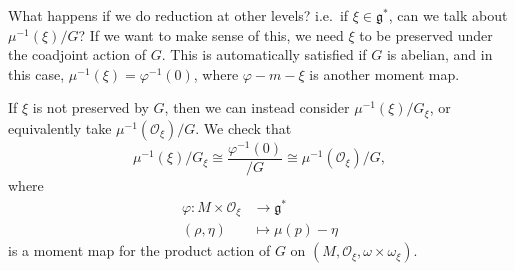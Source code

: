 \documentclass[a4paper]{article}
\begin{document}
What happens if we do reduction at other levels? i.e.\ if $\xi \in \mathfrak{g}^*$, can we talk about $\mu^{-1}(\xi)/G$? If we want to make sense of this, we need $\xi$ to be preserved under the coadjoint action of $G$. This is automatically satisfied if $G$ is abelian, and in this case, $\mu^{-1}(\xi) = \varphi^{-1}(0)$, where $\varphi -m - \xi$ is another moment map.

If $\xi$ is not preserved by $G$, then we can instead consider $\mu^{-1}(\xi)/G_\xi$, or equivalently take $\mu^{-1}(\mathcal{O}_\xi)/G$. We check that
\[
  \mu^{-1}(\xi)/G_\xi \cong \frac{\varphi^{-1}(0)}{/G} \cong \mu^{-1}(\mathcal{O}_\xi)/G,
\]
where
\begin{align*}
  \varphi: M \times \mathcal{O}_\xi &\to \mathfrak{g}^*\\
  (\rho, \eta) &\mapsto \mu(p) - \eta
\end{align*}
is a moment map for the product action of $G$ on $(M, \mathcal{O}_\xi, \omega \times \omega_\xi)$.
\end{document}
